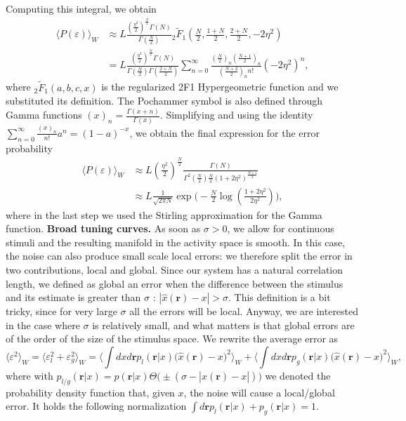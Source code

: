 \documentclass[a4paper]{article}
\begin{document}
Computing this integral, we obtain
\begin{equation}
\begin{split}
 \langle P(\varepsilon)\rangle_W &\approx L \frac{(\frac{\eta^2}{2})^{\frac{N}{2}}\Gamma(N)}{\Gamma(\frac{N}{2})} {}_2\tilde{F}_1(\frac{N}{2},\frac{1+N}{2},\frac{2+N}{2},-2\eta^2) \\
&=L \frac{(\frac{\eta^2}{2})^{\frac{N}{2}}\Gamma(N)}{\Gamma(\frac{N}{2})\Gamma(\frac{2+N}{2})}\sum_{n=0}^\infty \frac{(\frac{N}{2})_n (\frac{N+1}{2})_n}{(\frac{N+2}{2})_n n!} (-2\eta^2)^n,
\end{split}
\end{equation}where ${}_2\tilde{F}_1(a,b,c,x)$ is the regularized 2F1 Hypergeometric function and we substituted its definition.
The Pochammer symbol is also defined through Gamma functions $(x)_n = \frac{\Gamma(x+n)}{\Gamma(x)}$.  Simplifying and using the identity $\sum_{n=0}^\infty \frac{(x)_n}{n!} a^n = (1-a)^{-x}$, we obtain the final expression for the error probability \begin{equation}
\begin{split}
 \langle P(\varepsilon)\rangle_W &\approx L (\frac{\eta^2}{2})^{\frac{N}{2}} \frac{\Gamma(N)}{\Gamma^2(\frac{N}{2})  \frac{N}{2} (1+2\eta^2)^{\frac{N+1}{2}}}\\
&\approx L  \frac{1}{\sqrt{2\pi N}} \exp{\Big(-\frac{N}{2} \log(\frac{1+2\eta^2}{2\eta^2})\Big)},
\end{split}
\label{Eq:GE}
\end{equation}where in the last step we used the Stirling approximation for the Gamma function.
\newline
\newline
\textbf{Broad tuning curves.} As soon as $\sigma > 0$, we allow for continuous stimuli and the resulting manifold in the activity space is smooth. In this case, the noise can also produce small scale local errors: we therefore split the error in two contributions, local and global. Since our system has a natural correlation length, we defined as global an error when the difference between the stimulus and its estimate is greater than $\sigma$ : $|\hat{x}(\mathbf{r}) - x |> \sigma$. This definition is a bit tricky, since for very large $\sigma $ all the errors will be local. Anyway, we are interested in the case where $\sigma$ is relatively small, and what matters is that global errors are of the order of the size of the stimulus space.
We rewrite the average error as
\begin{equation}
\langle \varepsilon^2 \rangle_W= \langle \varepsilon_l^2 + \varepsilon_g^2 \rangle_W= \langle \int dx d\mathbf{r} p_l(\mathbf{r}|x)\big(\hat{x}(\mathbf{r}) -x \big)^2\rangle_W + \langle\int dx d\mathbf{r}p_g(\mathbf{r}|x) \big(\hat{x}(\mathbf{r}) -x \big)^2\rangle_W,
\end{equation}where with $p_{l/g}(\mathbf{r}|x) =  p(\mathbf{r}|x) \Theta \big(\pm(\sigma - |\hat{x}(\mathbf{r})-x|)\big)$ we denoted the probability density function that, given $x$, the noise will cause a local/global error. It holds the following normalization $\int d\mathbf{r} p_l(\mathbf{r}|x) + p_g(\mathbf{r}|x)=1$.
\end{document}
